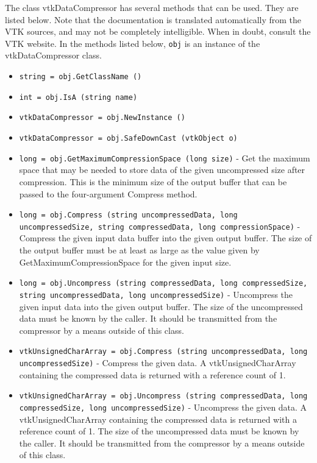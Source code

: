 The class vtkDataCompressor has several methods that can be used.
  They are listed below.
Note that the documentation is translated automatically from the VTK sources,
and may not be completely intelligible.  When in doubt, consult the VTK website.
In the methods listed below, \verb|obj| is an instance of the vtkDataCompressor class.
\begin{itemize}
\item  \verb|string = obj.GetClassName ()|

\item  \verb|int = obj.IsA (string name)|

\item  \verb|vtkDataCompressor = obj.NewInstance ()|

\item  \verb|vtkDataCompressor = obj.SafeDownCast (vtkObject o)|

\item  \verb|long = obj.GetMaximumCompressionSpace (long size)| -  Get the maximum space that may be needed to store data of the
 given uncompressed size after compression.  This is the minimum
 size of the output buffer that can be passed to the four-argument
 Compress method.

\item  \verb|long = obj.Compress (string uncompressedData, long uncompressedSize, string compressedData, long compressionSpace)| -  Compress the given input data buffer into the given output
 buffer.  The size of the output buffer must be at least as large
 as the value given by GetMaximumCompressionSpace for the given
 input size.

\item  \verb|long = obj.Uncompress (string compressedData, long compressedSize, string uncompressedData, long uncompressedSize)| -  Uncompress the given input data into the given output buffer.
 The size of the uncompressed data must be known by the caller.
 It should be transmitted from the compressor by a means outside
 of this class.

\item  \verb|vtkUnsignedCharArray = obj.Compress (string uncompressedData, long uncompressedSize)| -  Compress the given data.  A vtkUnsignedCharArray containing the
 compressed data is returned with a reference count of 1.

\item  \verb|vtkUnsignedCharArray = obj.Uncompress (string compressedData, long compressedSize, long uncompressedSize)| -  Uncompress the given data.  A vtkUnsignedCharArray containing the
 compressed data is returned with a reference count of 1.  The
 size of the uncompressed data must be known by the caller.  It
 should be transmitted from the compressor by a means outside of
 this class.

\end{itemize}

